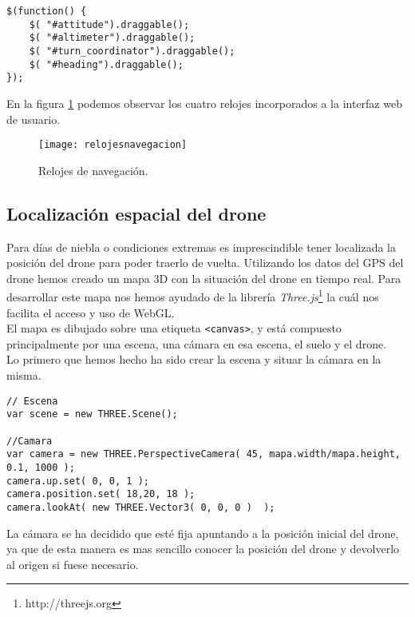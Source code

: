 \begin{lstlisting}[caption=Elementos arrastrables.]
$(function() {
    $( "#attitude").draggable();
    $( "#altimeter").draggable();
    $( "#turn_coordinator").draggable();
    $( "#heading").draggable();
});
\end{lstlisting}

En la figura \ref{fig:relojesnavegacion} podemos observar los cuatro relojes incorporados a la interfaz web de usuario.\\

\begin{figure}[h!]
\centering
\texttt{[image: relojesnavegacion]}
\caption{Relojes de navegación.}
\label{fig:relojesnavegacion}
\end{figure}

\subsection{Localización espacial del drone}

Para días de niebla o condiciones extremas es imprescindible tener localizada la posición del drone para poder traerlo de vuelta. Utilizando los datos del GPS del drone hemos creado un mapa 3D con la situación del drone en tiempo real. Para desarrollar este mapa nos hemos ayudado de la librería \emph{Three.js}\footnote{http://threejs.org} la cuál nos facilita el acceso y uso de WebGL.\\

El mapa es dibujado sobre una etiqueta \texttt{<canvas>}, y está compuesto principalmente por una escena, una cámara en esa escena, el suelo y el drone.\\

Lo primero que hemos hecho ha sido crear la escena y situar la cámara en la misma.\\

\begin{lstlisting}[caption=Escena y cámara en el mapa 3D.]
// Escena
var scene = new THREE.Scene();

//Camara
var camera = new THREE.PerspectiveCamera( 45, mapa.width/mapa.height, 0.1, 1000 );
camera.up.set( 0, 0, 1 );
camera.position.set( 18,20, 18 );
camera.lookAt( new THREE.Vector3( 0, 0, 0 )  );
\end{lstlisting}

La cámara se ha decidido que esté fija apuntando a la posición inicial del drone, ya que de esta manera es mas sencillo conocer la posición del drone y devolverlo al origen si fuese necesario.\\


